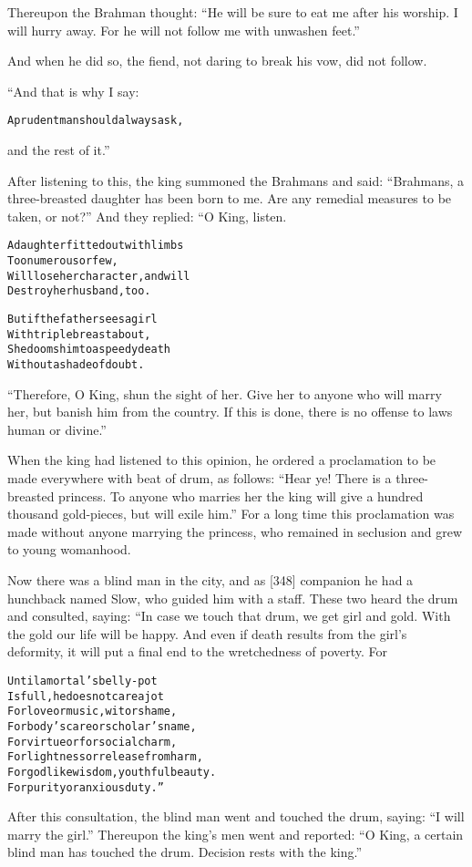 \documentclass{article}
\renewenvironment{verbatim}{\begin{alltt}\normalfont\begin{centering}}{\end{centering}\end{alltt}}
\begin{document}
Thereupon the Brahman thought:
``He will be sure to eat me after his worship. I will hurry away. For he will not follow me with unwashen feet.''

And when he did so, the fiend, not daring to break his vow, did not
follow.

“And that is why I say:

\begin{verbatim}
A prudent man should always ask,
\end{verbatim}
and the rest of it.”

After listening to this, the king summoned the Brahmans and said:
``Brahmans, a three-breasted daughter has been born to me. Are any remedial measures to be taken, or not?''
And they replied: “O King, listen.

\begin{verbatim}
A daughter fitted out with limbs
    Too numerous or few,
Will lose her character, and will
    Destroy her husband, too.

But if the father sees a girl
    With triple breast about,
She dooms him to a speedy death
    Without a shade of doubt.
\end{verbatim}
``Therefore, O King, shun the sight of her. Give her to anyone who will marry her, but banish him from the country. If this is done, there is no offense to laws human or divine.''

When the king had listened to this opinion, he ordered a
proclamation to be made everywhere with beat of drum, as follows:
``Hear ye! There is a three-breasted princess. To anyone who marries her the king will give a hundred thousand gold-pieces, but will exile him.''
For a long time this proclamation was made without anyone marrying
the princess, who remained in seclusion and grew to young
womanhood.

Now there was a blind man in the city, and as [348] companion he
had a hunchback named Slow, who guided him with a staff. These two
heard the drum and consulted, saying: “In case we touch that drum,
we get girl and gold. With the gold our life will be happy. And
even if death results from the girl's deformity, it will put a
final end to the wretchedness of poverty. For

\begin{verbatim}
Until a mortal's belly-pot
Is full, he does not care a jot
For love or music, wit or shame,
For body's care or scholar's name,
For virtue or for social charm,
For lightness or release from harm,
For godlike wisdom, youthful beauty.
For purity or anxious duty.”
\end{verbatim}
After this consultation, the blind man went and touched the drum,
saying: ``I will marry the girl.'' Thereupon the king's men went
and reported:
``O King, a certain blind man has touched the drum. Decision rests with the king.''
\end{document}
